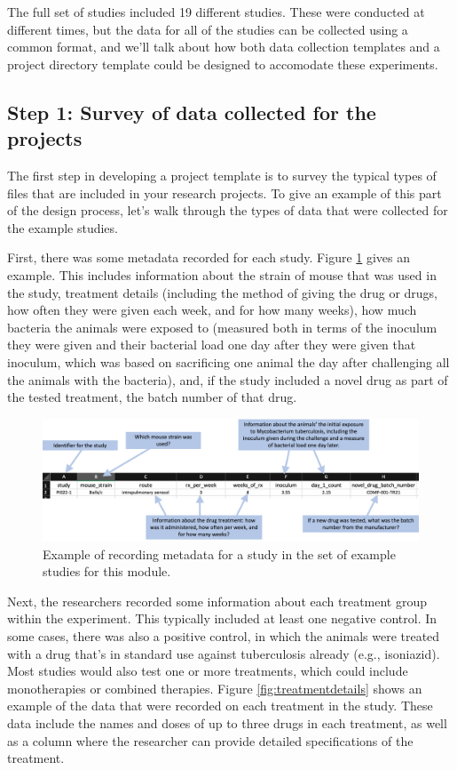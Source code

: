 \documentclass[]{tufte-book}
\begin{document}
The full set of studies included 19 different studies. These were conducted at
different times, but the data for all of the studies can be collected using a
common format, and we'll talk about how both data collection templates and a
project directory template could be designed to accomodate these experiments.

\subsection{Step 1: Survey of data collected for the projects}\label{step-1-survey-of-data-collected-for-the-projects}

The first step in developing a project template is to survey the typical types
of files that are included in your research projects. To give an example of this
part of the design process, let's walk through the types of data that were
collected for the example studies.

First, there was some metadata recorded for each study. Figure
\ref{fig:metadata} gives an example. This includes information about the strain
of mouse that was used in the study, treatment details (including the method of
giving the drug or drugs, how often they were given each week, and for how many
weeks), how much bacteria the animals were exposed to (measured both in terms of
the inoculum they were given and their bacterial load one day after they were
given that inoculum, which was based on sacrificing one animal the day after
challenging all the animals with the bacteria), and, if the study included a
novel drug as part of the tested treatment, the batch number of that drug.

\begin{figure}
\includegraphics[width=\textwidth]{figures/project_metadata} \caption[Example of recording metadata for a study in the set of example studies for this module]{Example of recording metadata for a study in the set of example studies for this module.}\label{fig:metadata}
\end{figure}

Next, the researchers recorded some information about each treatment group
within the experiment. This typically included at least one negative control. In
some cases, there was also a positive control, in which the animals were treated
with a drug that's in standard use against tuberculosis already (e.g.,
isoniazid). Most studies would also test one or more treatments, which could
include monotherapies or combined therapies. Figure \ref{fig:treatmentdetails}
shows an example of the data that were recorded on each treatment in the study.
These data include the names and doses of up to three drugs in each treatment,
as well as a column where the researcher can provide detailed specifications of
the treatment.
\end{document}
